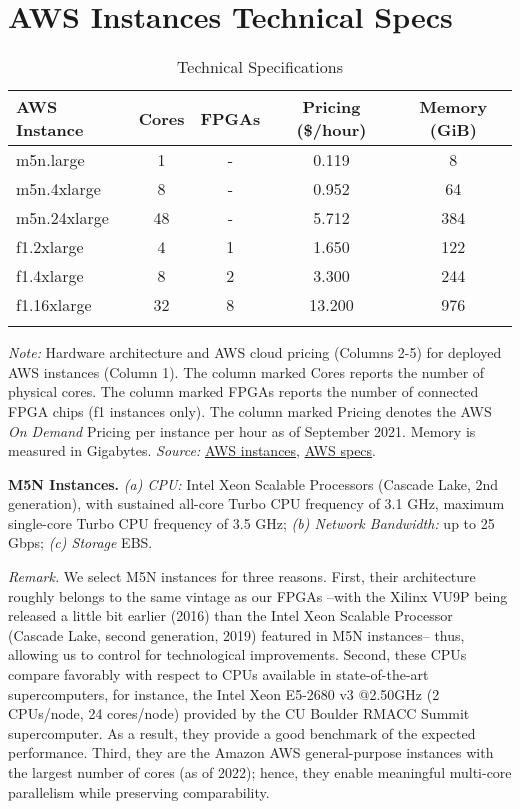 \documentclass[12pt,american]{article}
\makeatletter
\newcommand{\cpuI}{m5n.large\@\xspace}
\newcommand{\cpuII}{m5n.4xlarge\@\xspace}
\newcommand{\cpuIII}{m5n.24xlarge\@\xspace}
\newcommand{\awsinstfI}{f1.2xlarge\@\xspace}
\newcommand{\awsinstfII}{f1.4xlarge\@\xspace}
\newcommand{\awsinstfIII}{f1.16xlarge\@\xspace}
\makeatother
\begin{document}
\section{AWS Instances Technical Specs}\label{sec:aws:tecspe}

\begin{table}[ht!]
\begin{center}
\caption{Technical Specifications}
\begin{tabular}{l c c c c}
\toprule
\textbf{AWS Instance} & \textbf{Cores} & \textbf{FPGAs} & \textbf{Pricing} (\$/hour) & \textbf{Memory} (GiB) \\ 
\midrule
\cpuI & 1 & - & 0.119 & 8\\
\cpuII & 8 & - & 0.952 & 64\\
\cpuIII & 48 & - & 5.712 & 384\\
\awsinstfI & 4 & 1 & 1.650 & 122\\
\awsinstfII & 8 & 2 & 3.300 & 244\\
\awsinstfIII & 32 & 8 & 13.200 & 976\\
\bottomrule
\label{tab:tecspe}
\end{tabular}
\end{center}
\small
\noindent \textit{Note:} Hardware architecture and AWS cloud pricing (Columns 2-5) for deployed AWS instances (Column 1). The column marked Cores reports the number of physical cores. The column marked FPGAs reports the number of connected FPGA chips (f1 instances only). The column marked Pricing denotes the AWS \textit{On Demand} Pricing per instance per hour as of September 2021. Memory is measured in Gigabytes. \textit{Source:} \href{https://aws.amazon.com/ec2/instance-types/}{AWS instances}, \href{https://docs.aws.amazon.com/AWSEC2/latest/UserGuide/cpu-options-supported-instances-values.html}{AWS specs}.
\end{table}

\noindent \textbf{M5N Instances.} \textit{(a) CPU:} Intel Xeon Scalable Processors (Cascade Lake, 2nd generation), with sustained all-core Turbo CPU frequency of 3.1 GHz, maximum single-core Turbo CPU frequency of 3.5 GHz;
\textit{(b) Network Bandwidth:} up to 25 Gbps;
\textit{(c) Storage} EBS.

\textit{Remark.} We select M5N instances for three reasons. First, their architecture roughly belongs to the same vintage as our FPGAs --with the Xilinx VU9P being released a little bit earlier (2016) than the Intel Xeon Scalable Processor (Cascade Lake, second generation, 2019) featured in M5N instances-- thus, allowing us to control for technological improvements.
Second, these CPUs compare favorably with respect to CPUs available in state-of-the-art supercomputers, for instance, the Intel Xeon E5-2680 v3 @2.50GHz (2 CPUs/node, 24 cores/node) provided by the CU Boulder RMACC Summit supercomputer. As a result, they provide a good benchmark of the expected performance. Third, they are the Amazon AWS general-purpose instances with the largest number of cores (as of 2022); hence, they enable meaningful multi-core parallelism while preserving comparability. 
\end{document}
